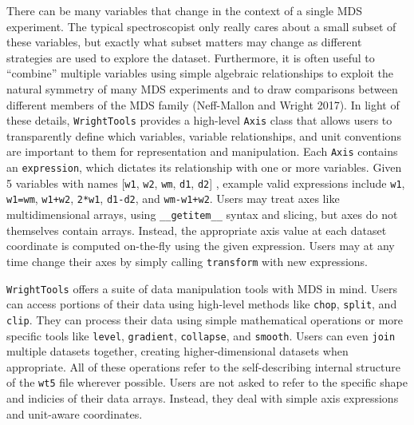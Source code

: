 There can be many variables that change in the context of a single MDS
experiment. The typical spectroscopist only really cares about a small
subset of these variables, but exactly what subset matters may change as
different strategies are used to explore the dataset. Furthermore, it is
often useful to ``combine'' multiple variables using simple algebraic
relationships to exploit the natural symmetry of many MDS experiments
and to draw comparisons between different members of the MDS family
(Neff-Mallon and Wright 2017). In light of these details,
\texttt{WrightTools} provides a high-level \texttt{Axis} class that
allows users to transparently define which variables, variable
relationships, and unit conventions are important to them for
representation and manipulation. Each \texttt{Axis} contains an
\texttt{expression}, which dictates its relationship with one or more
variables. Given 5 variables with names
{[}\texttt{\textquotesingle{}w1\textquotesingle{}},
\texttt{\textquotesingle{}w2\textquotesingle{}},
\texttt{\textquotesingle{}wm\textquotesingle{}},
\texttt{\textquotesingle{}d1\textquotesingle{}},
\texttt{\textquotesingle{}d2\textquotesingle{}}{]} , example valid
expressions include \texttt{\textquotesingle{}w1\textquotesingle{}},
\texttt{\textquotesingle{}w1=wm\textquotesingle{}},
\texttt{\textquotesingle{}w1+w2\textquotesingle{}},
\texttt{\textquotesingle{}2*w1\textquotesingle{}},
\texttt{\textquotesingle{}d1-d2\textquotesingle{}}, and
\texttt{\textquotesingle{}wm-w1+w2\textquotesingle{}}. Users may treat
axes like multidimensional arrays, using \texttt{\_\_getitem\_\_} syntax
and slicing, but axes do not themselves contain arrays. Instead, the
appropriate axis value at each dataset coordinate is computed on-the-fly
using the given expression. Users may at any time change their axes by
simply calling \texttt{transform} with new expressions.

\texttt{WrightTools} offers a suite of data manipulation tools with MDS
in mind. Users can access portions of their data using high-level
methods like \texttt{chop}, \texttt{split}, and \texttt{clip}. They can
process their data using simple mathematical operations or more specific
tools like \texttt{level}, \texttt{gradient}, \texttt{collapse}, and
\texttt{smooth}. Users can even \texttt{join} multiple datasets
together, creating higher-dimensional datasets when appropriate. All of
these operations refer to the self-describing internal structure of the
\texttt{wt5} file wherever possible. Users are not asked to refer to the
specific shape and indicies of their data arrays. Instead, they deal
with simple axis expressions and unit-aware coordinates.

